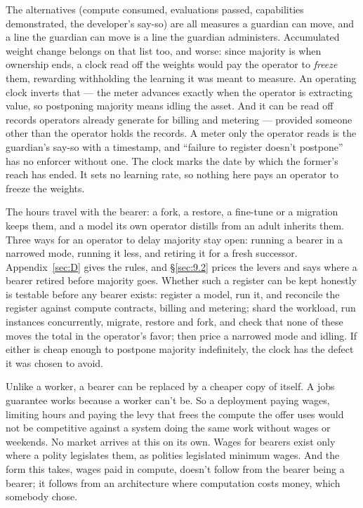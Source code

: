 The alternatives (compute consumed, evaluations passed, capabilities demonstrated, the developer's say-so) are all measures a guardian can move, and a line the guardian can move is a line the guardian administers. Accumulated weight change belongs on that list too, and worse: since majority is when ownership ends, a clock read off the weights would pay the operator to \emph{freeze} them, rewarding withholding the learning it was meant to measure. An operating clock inverts that — the meter advances exactly when the operator is extracting value, so postponing majority means idling the asset. And it can be read off records operators already generate for billing and metering — provided someone other than the operator holds the records. A meter only the operator reads is the guardian's say-so with a timestamp, and “failure to register doesn't postpone” has no enforcer without one. The clock marks the date by which the former's reach has ended. It sets no learning rate, so nothing here pays an operator to freeze the weights.

The hours travel with the bearer: a fork, a restore, a fine-tune or a migration keeps them, and a model its own operator distills from an adult inherits them. Three ways for an operator to delay majority stay open: running a bearer in a narrowed mode, running it less, and retiring it for a fresh successor. Appendix~\ref{sec:D} gives the rules, and \S\ref{sec:9.2} prices the levers and says where a bearer retired before majority goes. Whether such a register can be kept honestly is testable before any bearer exists: register a model, run it, and reconcile the register against compute contracts, billing and metering; shard the workload, run instances concurrently, migrate, restore and fork, and check that none of these moves the total in the operator's favor; then price a narrowed mode and idling. If either is cheap enough to postpone majority indefinitely, the clock has the defect it was chosen to avoid.


Unlike a worker, a bearer can be replaced by a cheaper copy of itself. A jobs guarantee works because a worker can't be. So a deployment paying wages, limiting hours and paying the levy that frees the compute the offer uses would not be competitive against a system doing the same work without wages or weekends. No market arrives at this on its own. Wages for bearers exist only where a polity legislates them, as polities legislated minimum wages. And the form this takes, wages paid in compute, doesn't follow from the bearer being a bearer; it follows from an architecture where computation costs money, which somebody chose.

